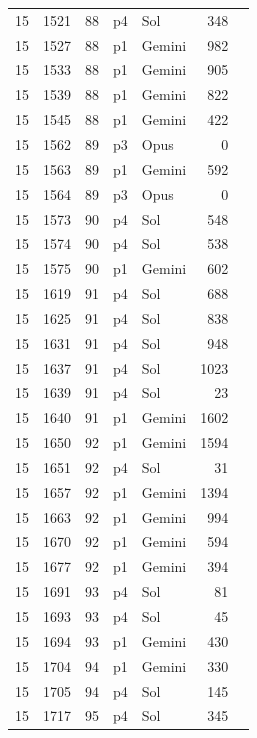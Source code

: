 \begin{longtable}{r r r l l r L{2.2in}}
15 & 1521 & 88 & p4 & Sol & 348 &  \\
15 & 1527 & 88 & p1 & Gemini & 982 &  \\
15 & 1533 & 88 & p1 & Gemini & 905 &  \\
15 & 1539 & 88 & p1 & Gemini & 822 &  \\
15 & 1545 & 88 & p1 & Gemini & 422 &  \\
15 & 1562 & 89 & p3 & Opus & 0 &  \\
15 & 1563 & 89 & p1 & Gemini & 592 &  \\
15 & 1564 & 89 & p3 & Opus & 0 &  \\
15 & 1573 & 90 & p4 & Sol & 548 &  \\
15 & 1574 & 90 & p4 & Sol & 538 &  \\
15 & 1575 & 90 & p1 & Gemini & 602 &  \\
15 & 1619 & 91 & p4 & Sol & 688 &  \\
15 & 1625 & 91 & p4 & Sol & 838 &  \\
15 & 1631 & 91 & p4 & Sol & 948 &  \\
15 & 1637 & 91 & p4 & Sol & 1023 &  \\
15 & 1639 & 91 & p4 & Sol & 23 &  \\
15 & 1640 & 91 & p1 & Gemini & 1602 &  \\
15 & 1650 & 92 & p1 & Gemini & 1594 &  \\
15 & 1651 & 92 & p4 & Sol & 31 &  \\
15 & 1657 & 92 & p1 & Gemini & 1394 &  \\
15 & 1663 & 92 & p1 & Gemini & 994 &  \\
15 & 1670 & 92 & p1 & Gemini & 594 &  \\
15 & 1677 & 92 & p1 & Gemini & 394 &  \\
15 & 1691 & 93 & p4 & Sol & 81 &  \\
15 & 1693 & 93 & p4 & Sol & 45 &  \\
15 & 1694 & 93 & p1 & Gemini & 430 &  \\
15 & 1704 & 94 & p1 & Gemini & 330 &  \\
15 & 1705 & 94 & p4 & Sol & 145 &  \\
15 & 1717 & 95 & p4 & Sol & 345 &  \\

\end{longtable}
